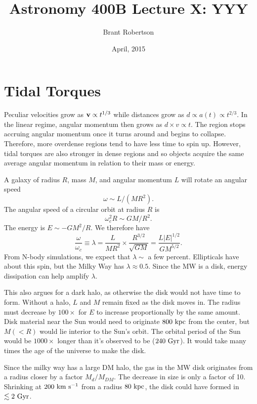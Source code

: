 \documentclass[]{article}
\title{Astronomy 400B Lecture X: YYY}
\author{Brant Robertson}
\date{April, 2015}
\begin{document}
\maketitle

\section{Tidal Torques}

Peculiar velocities grow as $\mathbf{v}\propto t^{1/3}$ while distances
grow as $d\propto a(t) \propto t^{2/3}$. In the linear regime,
angular momentum then grows as $d \times v\propto t$. The
region stops accruing angular momentum once it turns around
and begins to collapse. Therefore, more overdense regions 
tend to have less time to spin up.  However, tidal torques
are also stronger in dense regions and so objects
acquire the same average angular momentum in relation to their
mass or energy.

A galaxy of radius $R$, mass $M$, and angular momentum $L$
will rotate an angular speed
\begin{equation}
\omega \sim L / (MR^2).
\end{equation}
\noindent
The angular speed of a circular orbit at radius $R$ is
\begin{equation}
\omega_c^2 R \sim G M/R^2.
\end{equation}
The energy is $E\sim - GM^2/R$.  We therefore have 
\begin{equation}
\frac{\omega}{\omega_c}\equiv\lambda = \frac{L}{MR^2} \times \frac{R^{3/2}}{\sqrt{GM}} = \frac{L|E|^{1/2}}{GM^{5/2}}.
\end{equation}
\noindent
From N-body simulations, we expect that $\lambda\sim$ a  few percent.
Ellipticals have about this spin, but the Milky Way has $\lambda \approx 0.5$.
Since the MW is a disk, energy dissipation can help amplify $\lambda$.

This also argues for a dark halo, as otherwise the disk would
not have time to form.  Without a halo, $L$ and $M$ remain
fixed as the disk moves in.  The radius must decrease by $100\times$
for $E$ to increase proportionally by the same amount.
Disk material near the Sun would need to originate $800~\mathrm{kpc}$
from the center, but $M(<R)$ would lie interior to the Sun's orbit.
The orbital period of the Sun would be $1000\times$ longer than
it's observed to be ($240~\mathrm{Gyr}$).  It would take many times the
age of the universe to make the disk.

Since the milky way has a large DM halo, the gas in the MW disk
originates from a radius closer by a factor $M_d/M_{DM}$. The
decrease in size is only a factor of 10.  Shrinking at
$200~\mathrm{km}~\mathrm{s}^{-1}$ from a radius $80~\mathrm{kpc}$, the disk could
have formed in $\lesssim2~\mathrm{Gyr}$.
\end{document}
